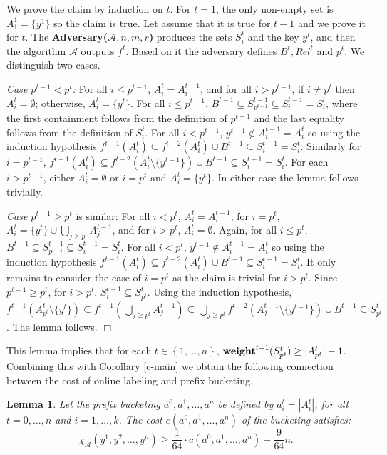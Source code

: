 \documentclass[11pt]{article}
\newtheorem{lemma}[theorem]{Lemma}
\newcommand{\qed}{$\Box$}
\newenvironment{proof}{\noindent {\bf Proof:}}{\hfill \qed \smallskip}
\newcommand{\A}{\mathcal{A}}
\newcommand{\natInt}[2]{ \left\{ #1, \dotsc, #2 \right\} }
\newcommand{\weight}{{\rm {\bf weight}}}
\begin{document}
\begin{proof}  %
We prove the claim by induction on $t$. For $t=1$, the only non-empty set is $A^1_1=\{y^1\}$ so the claim is true.
Let assume that it is true for $t-1$ and we prove it for $t$.
The {\bf Adversary($\A,n,m,r$)} produces the sets $S^t_i$ and the key $y^t$, and then the algorithm $\A$ outputs $f^t$.
Based on it the adversary defines $B^t, Rel^t$ and $p^t$.
We distinguish two cases.

\emph{Case $p^{t-1} < p^t$:} For all $i\le p^{t-1}$, $A^{t}_i = A^{t-1}_i$, and for all $i> p^{t-1}$, if $i\not=p^t$ then $A^t_i=\emptyset$;
otherwise, $A^t_i = \{y^t\}$. For all $i\le p^{t-1}$, $B^{t-1} \subseteq S^{t-1}_{p^{t-1}} \subseteq S^{t-1}_i = S^t_i$, where
the first containment follows from the definition of $p^{t-1}$ and the last equality follows from the definition of $S^t_i$.
For all $i<p^{t-1}$, $y^{t-1} \not\in A^{t-1}_i = A^t_i$ so using the induction hypothesis
$f^{t-1}(A^t_i) \subseteq f^{t-2}(A^t_i) \cup B^{t-1} \subseteq S^{t-1}_i = S^t_i$.
Similarly for $i=p^{t-1}$, $f^{t-1}(A^t_i) \subseteq f^{t-2}(A^t_i \setminus \{y^{t-1}\}) \cup B^{t-1} \subseteq S^{t-1}_i = S^t_i$.
For each $i>p^{t-1}$, either $A^t_i = \emptyset$ or $i=p^t$ and $A^t_i=\{y^t\}$. In either case the lemma follows trivially.

\emph{Case $p^{t-1} \ge p^t$} is similar: For all $i < p^{t}$, $A^{t}_i = A^{t-1}_i$, for $i=p^t$, $A^t_i = \{y^t\} \cup \bigcup_{j\ge p^t} A^{t-1}_j$,
and for $i>p^t$, $A^t_i=\emptyset$. Again, for all $i\le p^{t}$, $B^{t-1} \subseteq S^{t-1}_{p^{t-1}} \subseteq S^{t-1}_i = S^t_i$.
For all $i<p^{t}$, $y^{t-1} \not\in A^{t-1}_i = A^t_i$ so using the induction hypothesis
$f^{t-1}(A^t_i) \subseteq f^{t-2}(A^t_i) \cup B^{t-1} \subseteq S^{t-1}_i = S^t_i$.
It only remains to consider the case of $i=p^t$ as the claim is trivial for $i>p^t$.
Since $p^{t-1} \ge p^t$, for $i>p^t$, $S^{t-1}_i \subseteq S^t_{p^t}$.
Using the induction hypothesis, $f^{t-1}(A^t_{p^t} \setminus \{y^t\}) \subseteq f^{t-1}(\bigcup_{j\ge p^t} A^{t-1}_j)
\subseteq \bigcup_{j\ge p^t} f^{t-2}( A^{t-1}_j \setminus \{y^{t-1}\}) \cup B^{t-1} \subseteq S^t_{p^t}$. The lemma follows.
\end{proof}

This lemma implies that for each $t \in \natInt{1}{n}$, $\weight^{t-1}(S^t_{p^t}) \ge |A^t_{p^t}| - 1$.
Combining this with  Corollary \ref{c-main} we obtain the following connection between
the cost of online labeling and prefix bucketing.

\begin{lemma}\label{l-b2l}
Let the prefix bucketing $a^0,a^1,\dotsc,a^n$ be defined by $a^t_i = |A^t_i|$, for all $t=0,\dotsc,n$ and $i=1,\dotsc,k$.
The cost $c(a^0,a^1,\dotsc,a^n)$ of the bucketing satisfies:
$$\chi_\A(y^1,y^2,\dotsc,y^n) \ge \frac{1}{64} \cdot c(a^0,a^1,\dotsc,a^n) - \frac{9}{64} n.$$
\end{lemma}
\end{document}
